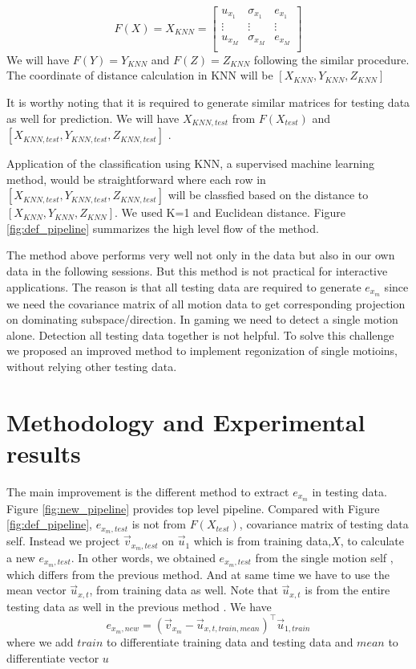 \documentclass[acmtog]{acmart}
\begin{document}
\begin{equation}
F(X)=
X_{KNN} =
\begin{bmatrix}
u_{x_1} & \sigma_{x_1} & e_{x_1} \\
 \vdots & \vdots & \vdots \\
u_{x_M} & \sigma_{x_M} & e_{x_M} \\
\end{bmatrix}
\label{eq:f_func}
\end{equation}
We will have $F(Y)=Y_{KNN}$ and $F(Z)=Z_{KNN}$ following the similar procedure. The coordinate of  distance calculation in KNN will be $[X_{KNN} ,Y_{KNN}, Z_{KNN} ] $

It is worthy noting that it is required to generate similar matrices for testing data as well for prediction. We will have  $X_{KNN,test}$ from $F(X_{test})$ and  $[X_{KNN,test} ,Y_{KNN,test} ,Z_{KNN,test} ] $  \cite{matlab1}.

Application of the classification using KNN, a supervised machine learning method, would be straightforward where each row in \\ $[X_{KNN,test} ,Y_{KNN,test} ,Z_{KNN,test} ] $
 will be classfied based on the distance to $[X_{KNN} ,Y_{KNN}, Z_{KNN} ] $. We used K=1 and Euclidean distance.  Figure \ref{fig:def_pipeline} summarizes the high level flow of the method.
 
 The method above performs very well not only in the data \cite{human_data,matlab1} but also in our own data in the following sessions. But this method is not practical for interactive applications. The reason is that  all testing data are required to generate $e_{x_m}$ since we need  the covariance matrix of all motion data to get corresponding projection on dominating subspace/direction. In  gaming we need to detect a single motion alone. Detection all testing data together is not helpful. To solve this challenge we proposed an improved method to implement regonization of single motioins, without relying other testing data.
 
\section{Methodology and Experimental results}

The main improvement is the different method to extract $e_{x_m}$ in testing data. Figure \ref{fig:new_pipeline} provides top level pipeline. Compared with Figure \ref{fig:def_pipeline},  $e_{x_m, test}$ is not from $F(X_{test})$, covariance matrix of testing data self. Instead we project $\vec{v}_{x_m,test}$  on $\vec{u}_1$ which is from  training data,$X$, to calculate a new $e_{x_m,test}$. In other words, we obtained $e_{x_m,test}$ from the single motion self , which differs from  the  previous method. And at same time we have to use the mean vector $\vec{u}_{x,t}$, from training data as well. Note that $\vec{u}_{x,t}$ is from the entire testing data as well in the previous method . We have
\begin{equation}
e_{x_m,new}=(\vec{v}_{x_m}-\vec{u}_{x,t,train,mean})^\top \vec{u}_{1,train}
 \label{eq:e_on_M_new}
\end{equation}
where we add $train$ to differentiate training data and testing data and $mean$ to differentiate vector $u$
\end{document}
